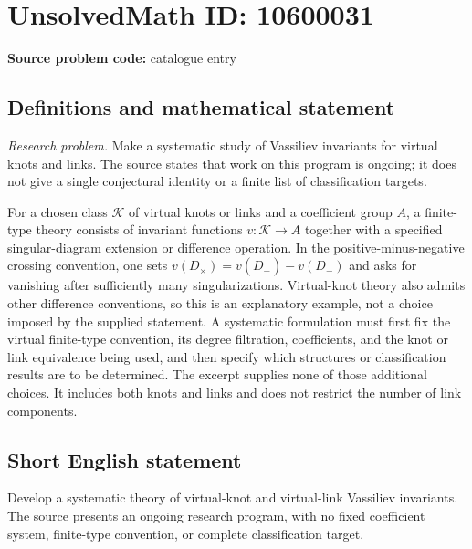 \documentclass[11pt]{article}
\begin{document}
\section*{UnsolvedMath ID: 10600031}
\textbf{Source problem code:} catalogue entry
\subsection{Definitions and mathematical statement}
\emph{Research problem.} Make a systematic study of Vassiliev invariants for virtual knots and links. The source states that work on this program is ongoing; it does not give a single conjectural identity or a finite list of classification targets.

For a chosen class \(\mathcal K\) of virtual knots or links and a coefficient group \(A\), a finite-type theory consists of invariant functions \(v:\mathcal K\to A\) together with a specified singular-diagram extension or difference operation. In the positive-minus-negative crossing convention, one sets \(v(D_\times)=v(D_+)-v(D_-)\) and asks for vanishing after sufficiently many singularizations. Virtual-knot theory also admits other difference conventions, so this is an explanatory example, not a choice imposed by the supplied statement. A systematic formulation must first fix the virtual finite-type convention, its degree filtration, coefficients, and the knot or link equivalence being used, and then specify which structures or classification results are to be determined. The excerpt supplies none of those additional choices. It includes both knots and links and does not restrict the number of link components.
\subsection{Short English statement}
Develop a systematic theory of virtual-knot and virtual-link Vassiliev invariants. The source presents an ongoing research program, with no fixed coefficient system, finite-type convention, or complete classification target.
\end{document}
